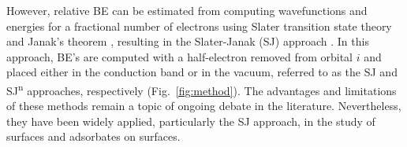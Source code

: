 \documentclass[journal=jpccck,manuscript=article]{achemso}
\begin{document}
However, relative BE can be estimated from computing wavefunctions and energies for a fractional number of electrons using Slater transition state theory and Janak's theorem \cite{janakProofThatFrac1978}, resulting in the Slater-Janak (SJ) approach \cite{hiraoImprovedSlaterTransition2021}. In this approach, BE's are computed with a half-electron removed from orbital $i$ and placed either in the conduction band or in the vacuum, referred to as the SJ and SJ\textsuperscript{n} approaches\cite{pueyobellafontPredictingCoreLevel2017}, respectively (Fig.~\ref{fig:method}). The advantages and limitations of these methods remain a topic of ongoing debate in the literature\cite{olovssonCorelevelShiftsComplex2006,taucherFinalStateSimulationsCoreLevel2020}. Nevertheless, they have been widely applied, particularly the SJ approach, in the study of surfaces\cite{olovssonFirstPrincipleCalculations2010,bagusRevisitingSurfaceCorelevel2019,bagusXrayPhotoelectronSpectroscopy2024} and adsorbates on surfaces\cite{babyAnchoringBendingPentacene2015,salvarezzaExploringCoreLevel2015,fujimoriInteractionWaterCaO2016a,taucherFinalStateSimulationsCoreLevel2020}.
\end{document}
